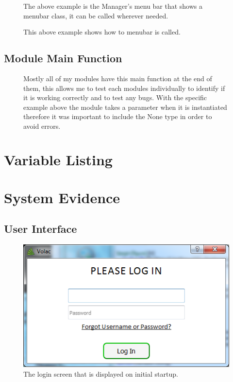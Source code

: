 \begin{figure}[H]
    \caption{The above example is the Manager's menu bar that shows a menubar class, it can be called wherever needed.} \label{fig:Dialog Class}
\end{figure}

\begin{figure}[H]
    \caption{This above example shows how to menubar is called.} \label{fig:Dialog Class}
\end{figure}

\subsection{Module Main Function}
 
 \begin{figure}[H]
    \caption{Mostly all of my modules have this main function at the end of them, this allows me to test each modules individually to identify if it is working correctly and to test any bugs. With the specific example above the module takes a parameter when it is instantiated therefore it was important to include the None type in order to avoid errors.} \label{fig:Dialog Class}
\end{figure}

\section{Variable Listing}

\section{System Evidence}

\subsection{User Interface}


\begin{figure}[H]
    \includegraphics[width=\textwidth]{./Maintenance/Images/LoginWindow.png}
    \caption{The login screen that is displayed on initial startup.} \label{fig:LoginWindow}
\end{figure}

